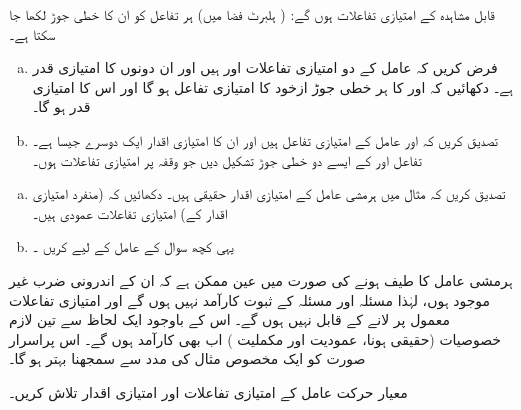 قابل مشاہدہ  کے امتیازی تفاعلات   ہوں گے:  ( ہلبرٹ  فضا  میں) ہر تفاعل کو ان کا خطی جوڑ لکھا جا سکتا ہے۔ 

\begin{enumerate}[a.]
\item
  فرض کریں کہ عامل  کے دو امتیازی تفاعلات   اور   ہیں اور ان دونوں کا امتیازی قدر  ہے۔  دکھائیں کہ  اور  کا ہر خطی جوڑ ازخود  کا امتیازی تفاعل ہو گا   اور اس  کا  امتیازی قدر  ہو گا۔
\item
 تصدیق کریں کہ  اور   عامل  کے امتیازی تفاعل ہیں اور ان کا امتیازی اقدار ایک دوسرے جیسا  ہے۔تفاعل    اور  کے ایسے دو خطی جوڑ تشکیل  دیں جو وقفہ  پر   امتیازی تفاعلات ہوں۔
\end{enumerate}
\begin{enumerate}[a.]
\item
 تصدیق کریں کہ مثال  میں ہرمشی عامل کے امتیازی اقدار حقیقی ہیں۔  دکھائیں کہ (منفرد امتیازی اقدار کے)  امتیازی تفاعلات عمودی ہیں۔ 
\item
 یہی کچھ سوال  کے عامل کے لیے کریں ۔
\end{enumerate}


ہرمشی عامل کا طیف     ہونے کی صورت میں عین ممکن ہے کہ ان کے  اندرونی ضرب  غیر موجود   ہوں،  لہٰذا مسئلہ    اور مسئلہ    کے ثبوت کارآمد نہیں ہوں گے  اور  امتیازی تفاعلات  معمول پر لانے کے قابل نہیں ہوں گے۔  اس کے باوجود ایک لحاظ سے  تین لازم خصوصیات (حقیقی ہونا، عمودیت اور مکملیت   ) اب بھی کارآمد ہوں گے۔    اس پراسرار    صورت کو ایک مخصوص مثال کی مدد سے سمجھنا بہتر ہو گا۔



معیار حرکت عامل کے امتیازی تفاعلات  اور امتیازی اقدار تلاش کریں۔

